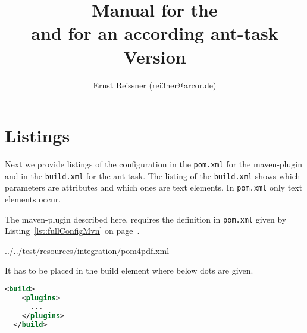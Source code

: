 \documentclass[12pt]{book}
\title{Manual for the \artifactId{} \protect\\
  and for an according ant-task \protect\\
Version \strippedVersionID}
\author{Ernst Reissner (rei3ner@arcor.de)}
\date{\versionDate}
\renewcommand{\lstlistoflistings}{\begingroup
\tocfile{\lstlistingname}{lol}
\endgroup}
\renewcommand{\lstlistoflistings}{\begingroup
\tocfile{List of \lstlistingname{}s}{lol}
\endgroup}
\begin{document}
\maketitle

\tableofcontents
\listoffigures
\listoftables
\lstlistoflistings%











\chapter{Listings}\label{chap:listings}%



% 


Next we provide listings of the configuration 
in the \texttt{pom.xml} for the maven-plugin 
and in the \texttt{build.xml} for the ant-task. 
The listing of the \texttt{build.xml} shows 
which parameters are attributes and which ones are text elements. 
In \texttt{pom.xml} only text elements occur. 


The maven-plugin described here, 
requires the definition in \texttt{pom.xml}
given by Listing~\ref{lst:fullConfigMvn} on page~\pageref{lst:fullConfigMvn}. 


{../../test/resources/integration/pom4pdf.xml}%

It has to be placed in the build element where below dots are given. 

\begin{lstlisting}[language=xml]
  <build>
    <plugins>
      ...
    </plugins>
  </build>
\end{lstlisting}
\end{document}
